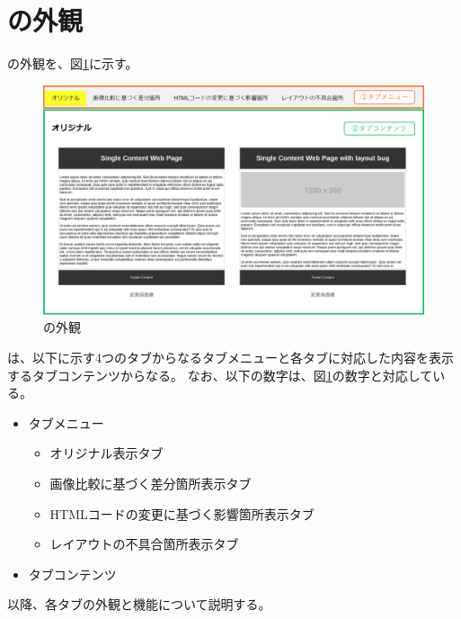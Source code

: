\section{\toolName の外観}
\toolName の外観を、図\ref{fig: Appearance}に示す。
\begin{figure}[tp]
    \begin{center}
        \includegraphics[width=1.0\columnwidth]{image/3_Appearance2.png}
        \caption{\toolName の外観}
        \label{fig: Appearance}
    \end{center}
\end{figure}
\toolName は、以下に示す4つのタブからなるタブメニューと各タブに対応した内容を表示するタブコンテンツからなる。
なお、以下の数字は、図\ref{fig: Appearance}の数字と対応している。
\begin{itemize}
    \item[①] タブメニュー
          \begin{itemize}
              \item オリジナル表示タブ
              \item 画像比較に基づく差分箇所表示タブ
              \item HTMLコードの変更に基づく影響箇所表示タブ
              \item レイアウトの不具合箇所表示タブ
          \end{itemize}
    \item[②] タブコンテンツ
\end{itemize}
\par
以降、各タブの外観と機能について説明する。

